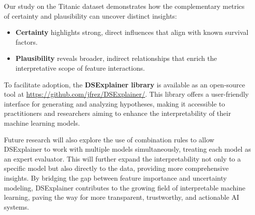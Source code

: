 \documentclass[acmlarge]{acmart}
\begin{document}
Our study on the Titanic dataset demonstrates how the complementary metrics of certainty and plausibility can uncover distinct insights:
\begin{itemize}
    \item \textbf{Certainty} highlights strong, direct influences that align with known survival factors.
    \item \textbf{Plausibility} reveals broader, indirect relationships that enrich the interpretative scope of feature interactions.
\end{itemize}

To facilitate adoption, the \textbf{DSExplainer library} is available as an open-source tool at \url{https://github.com/jfrez/DSExplainer/}. This library offers a user-friendly interface for generating and analyzing hypotheses, making it accessible to practitioners and researchers aiming to enhance the interpretability of their machine learning models.

Future research will also explore the use of combination rules to allow DSExplainer to work with multiple models simultaneously, treating each model as an expert evaluator. This will further expand the interpretability not only to a specific model but also directly to the data, providing more comprehensive insights. By bridging the gap between feature importance and uncertainty modeling, DSExplainer contributes to the growing field of interpretable machine learning, paving the way for more transparent, trustworthy, and actionable AI systems.



\end{document}
